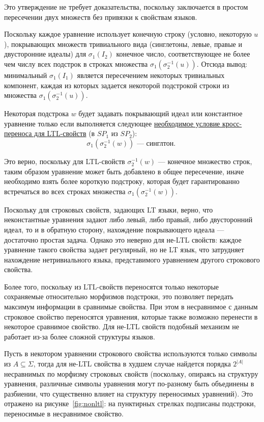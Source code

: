 \documentclass[fontsize=14pt]{scrartcl}
\begin{document}
Это утверждение не требует доказательства, поскольку заключается в простом пересечении двух множеств без привязки к свойствам языков.

Поскольку каждое уравнение использует конечную строку (условно, некоторую $u$), покрывающих множеств тривиального вида (синглетоны, левые, правые и двусторонние идеалы)
для $\sigma_1(I_2)$ конечное число, соответствующее не более чем числу всех подстрок в строках множества $\sigma_1(\sigma_2^{-1}(u))$. Отсюда вывод:
минимальный $\sigma_1(I_1)$ является пересечением некоторых тривиальных компонент, каждая из которых задается некоторой подстрокой строки из множества
 $\sigma_1(\sigma_2^{-1}(u))$.


Некоторая подстрока $w$ будет задавать покрывающий идеал или константное уравнение только если выполняется следующее 
\underline{необходимое условие кросс-переноса для LTL-свойств} (в $SP_1$ из $SP_2$):
\begin{equation}
    \sigma_1(\sigma_2^{-1}(w)) \text{ --- синглтон. }
\end{equation}

Это верно, поскольку для LTL-свойств $\sigma_2^{-1}(w)$ --- конечное множество строк, таким образом уравнение может быть добавлено в общее пересечение, 
иначе необходимо взять более короткую подстроку, которая будет гарантированно встречаться во всех строках множества $\sigma_1(\sigma_2^{-1}(w))$.

Поскольку для строковых свойств, задающих LT языки, верно, что неконстантные уравнения задают либо левый, либо правый, либо двусторонний идеал, то и в обратную сторону,
нахождение покрывающего идеала --- достаточно простая задача. Однако это неверно для не-LTL свойств: каждое уравнение такого свойства задает регулярный, но не LT язык, что 
затрудняет нахождение нетривиального языка, представимого уравнением другого строкового свойства. 

Более того, поскольку из LTL-свойств переносятся только некоторые сохраняемые относительно морфизмов подстроки, это 
позволяет передать максимум информации в сравнимые свойства. При этом в несравнимое с данным строковое свойство переносятся
уравнения, которые также возможно перенести в некоторое сравнимое свойство. Для не-LTL свойств подобный механизм не работает
из-за более сложной структуры языков. 

Пусть в некотором уравнении строкового свойства используются только символы из $A \subseteq \Sigma$, 
тогда для не-LTL свойства в худшем случае найдется порядка  $2^{|A|}$ несравнимых по морфизму строковых свойств (поскольку, опираясь на структуру уравнения, различные символы уравнения
могут по-разному быть объединены в разбиении, что существенно влияет на структуру переносимых уравнений). Это 
отражено на рисунке~\ref{fig:nonltl}: на пунктирных стрелках подписаны подстроки, переносимые в несравнимое свойство.
\end{document}
